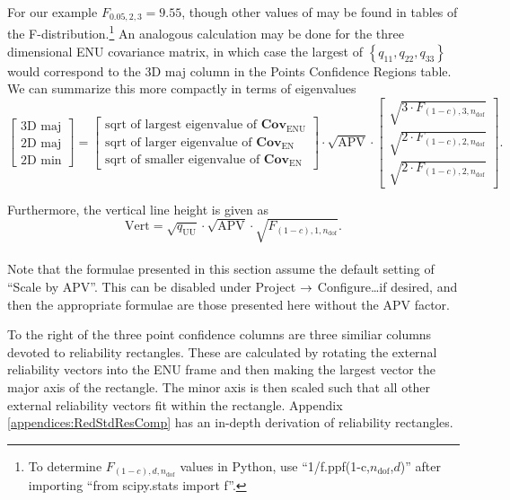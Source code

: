 For our example $F_{0.05,2,3}=9.55$, though other values of may be found in tables of the F-distribution.\footnote{To determine $F_{(1-c),d,n_{\text{dof}}}$ values in Python, use ``1/f.ppf(1-c,$n_{\text{dof}}$,$d$)'' after importing ``from scipy.stats import f''.}  An analogous calculation may be done for the three dimensional ENU covariance matrix, in which case the largest of $\left\{q_{11},q_{22},q_{33}\right\}$ would correspond to the 3D maj column in the Points Confidence Regions table.  We can summarize this more compactly in terms of eigenvalues
\begin{equation}
\left[\begin{array}{c}\text{3D maj}\\\text{2D maj}\\\text{2D min}\end{array}\right]=\left[\begin{array}{c}\text{sqrt of largest eigenvalue of }\mathbf{Cov}_{\text{ENU}}\\\text{sqrt of larger eigenvalue of }\mathbf{Cov}_{\text{EN}}\\\text{sqrt of smaller eigenvalue of }\mathbf{Cov}_{\text{EN}}\end{array}\right]\cdot\sqrt{\text{APV}}\cdot\left[\begin{array}{c}\sqrt{3\cdot F_{(1-c),3,n_{\text{dof}}}}\\\sqrt{2\cdot F_{(1-c),2,n_{\text{dof}}}}\\\sqrt{2\cdot F_{(1-c),2,n_{\text{dof}}}}\end{array}\right].
\end{equation}

Furthermore, the vertical line height is given as
\begin{equation}
\text{Vert}=\sqrt{q_{\text{UU}}}\cdot\sqrt{\text{APV}}\cdot\sqrt{F_{(1-c),1,n_{\text{dof}}}}.
\end{equation}
{}\\

Note that the formulae presented in this section assume the default setting of ``Scale by APV''.  This can be disabled under Project $\rightarrow$ Configure\ldots if desired, and then the appropriate formulae are those presented here without the APV factor.

To the right of the three point confidence columns are three similiar columns devoted to reliability rectangles. These are calculated by rotating the external reliability vectors into the ENU frame and then making the largest vector the major axis of the rectangle. The minor axis is then scaled such that all other external reliability vectors fit within the rectangle. Appendix \ref{appendices:RedStdResComp} has an in-depth derivation of reliability rectangles.


